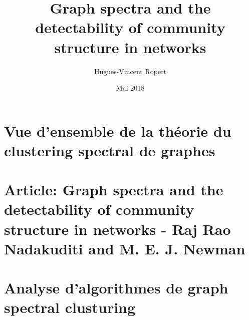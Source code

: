 \documentclass{article} %
\title{Graph spectra and the detectability of community structure in networks}
\author{Hugues-Vincent Ropert}
\date{Mai 2018}
\begin{document}
\maketitle

\tableofcontents

\part{Vue d'ensemble de la théorie du clustering spectral de graphes}



\part{Article: Graph spectra and the detectability of community structure in networks - Raj Rao Nadakuditi and M. E. J. Newman}



\nocite{*}

\part{Analyse d'algorithmes de graph spectral clusturing}




\end{document}
